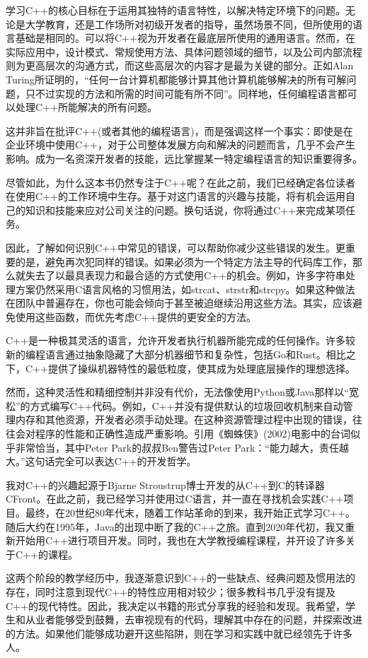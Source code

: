 ﻿学习C++的核心目标在于运用其独特的语言特性，以解决特定环境下的问题。无论是大学教育，还是工作场所对初级开发者的指导，虽然场景不同，但所使用的语言基础是相同的。可以将C++视为开发者在最底层所使用的通用语言。然而，在实际应用中，设计模式、常规使用方法、具体问题领域的细节，以及公司内部流程则为更高层次的沟通方式，而这些高层次的内容才是最为关键的部分。正如Alan Turing所证明的，“任何一台计算机都能够计算其他计算机能够解决的所有可解问题，只不过实现的方法和所需的时间可能有所不同”。同样地，任何编程语言都可以处理C++所能解决的所有问题。

这并非旨在批评C++(或者其他的编程语言)，而是强调这样一个事实：即使是在企业环境中使用C++，对于公司整体发展方向和解决的问题而言，几乎不会产生影响。成为一名资深开发者的技能，远比掌握某一特定编程语言的知识重要得多。

尽管如此，为什么这本书仍然专注于C++呢？在此之前，我们已经确定各位读者在使用C++的工作环境中生存。基于对这门语言的兴趣与技能，将有机会运用自己的知识和技能来应对公司关注的问题。换句话说，你将通过C++来完成某项任务。

因此，了解如何识别C++中常见的错误，可以帮助你减少这些错误的发生。更重要的是，避免再次犯同样的错误。如果必须为一个特定方法主导的代码库工作，那么就失去了以最具表现力和最合适的方式使用C++的机会。例如，许多字符串处理方案仍然采用C语言风格的习惯用法，如strcat、strstr和strcpy。如果这种做法在团队中普遍存在，你也可能会倾向于甚至被迫继续沿用这些方法。其实，应该避免使用这些函数，而优先考虑C++提供的更安全的方法。

C++是一种极其灵活的语言，允许开发者执行机器所能完成的任何操作。许多较新的编程语言通过抽象隐藏了大部分机器细节和复杂性，包括Go和Rust。相比之下，C++提供了操纵机器特性的最低粒度，使其成为处理底层操作的理想选择。

然而，这种灵活性和精细控制并非没有代价，无法像使用Python或Java那样以“宽松”的方式编写C++代码。例如，C++并没有提供默认的垃圾回收机制来自动管理内存和其他资源，开发者必须手动处理。在这种资源管理过程中出现的错误，往往会对程序的性能和正确性造成严重影响。引用《蜘蛛侠》(2002)电影中的台词似乎非常恰当，其中Peter Park的叔叔Ben警告过Peter Park：“能力越大，责任越大。”这句话完全可以表达C++的开发哲学。

我对C++的兴趣起源于Bjarne Stroustrup博士开发的从C++到C的转译器CFront。在此之前，我已经学习并使用过C语言，并一直在寻找机会实践C++项目。最终，在20世纪80年代末，随着工作站革命的到来，我开始正式学习C++。随后大约在1995年，Java的出现中断了我的C++之旅。直到2020年代初，我又重新开始用C++进行项目开发。同时，我也在大学教授编程课程，并开设了许多关于C++的课程。

这两个阶段的教学经历中，我逐渐意识到C++的一些缺点、经典问题及惯用法的存在，同时注意到现代C++的特性应用相对较少；很多教科书几乎没有提及C++的现代特性。因此，我决定以书籍的形式分享我的经验和发现。我希望，学生和从业者能够受到鼓舞，去审视现有的代码，理解其中存在的问题，并探索改进的方法。如果他们能够成功避开这些陷阱，则在学习和实践中就已经领先于许多人。

